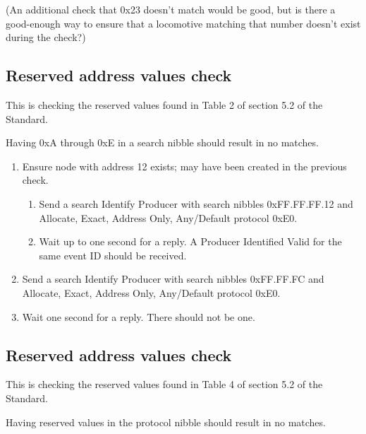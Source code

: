 (An additional check that 0x23 doesn't match would be good, but is there a good-enough way
to ensure that a locomotive matching that number doesn't exist during the check?)

\subsection{Reserved address values check}

This is checking the reserved values found in Table 2 of section 5.2 of the Standard.

Having 0xA through 0xE in a search nibble should result in no matches.

\begin{enumerate}

\item Ensure node with address 12 exists; may have been created in the previous check.

    \begin{enumerate}
    \item Send a search Identify Producer with search nibbles 0xFF.FF.FF.12 and 
        Allocate, Exact, Address Only, Any/Default protocol 0xE0.

    \item Wait up to one second for a reply.  A Producer Identified Valid for the same event ID
        should be received.
    \end{enumerate}

\item Send a search Identify Producer with search nibbles 0xFF.FF.FC and 
    Allocate, Exact, Address Only, Any/Default protocol 0xE0.

\item Wait one second for a reply.  There should not be one.

\end{enumerate}

\subsection{Reserved address values check}

This is checking the reserved values found in Table 4 of section 5.2 of the Standard.

Having reserved values in the protocol nibble should result in no matches.

